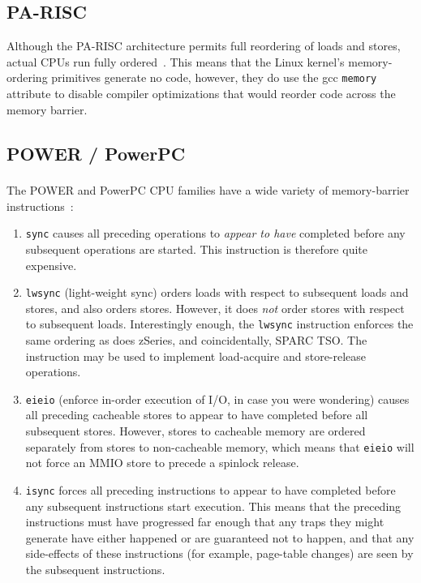 \subsection{PA-RISC}

Although the PA-RISC architecture permits full reordering of loads and
stores, actual CPUs run fully ordered~\cite{GerryKane96a}.
This means that the Linux kernel's memory-ordering primitives generate
no code, however, they do use the gcc {\tt memory} attribute to disable
compiler optimizations that would reorder code across the memory
barrier.

\subsection{POWER / PowerPC}
\label{sec:app:whymb:POWER / PowerPC}

The POWER and PowerPC\textsuperscript{\textregistered}
CPU families have a wide variety of memory-barrier
instructions~\cite{PowerPC94,MichaelLyons02a}:
\begin{enumerate}
\item	{\tt sync} causes all preceding operations to {\em appear to have}
	completed before any subsequent operations are started.
	This instruction is therefore quite expensive.
\item	{\tt lwsync} (light-weight sync) orders loads with respect to
	subsequent loads and stores, and also orders stores.
	However, it does {\em not} order stores with respect to subsequent
	loads.
	Interestingly enough, the {\tt lwsync} instruction enforces
	the same ordering as does zSeries, and coincidentally,
	SPARC TSO.
	The  instruction may be used to implement
	load-acquire and store-release operations.
\item	{\tt eieio} (enforce in-order execution of I/O, in case you
	were wondering) causes all preceding cacheable stores to appear
	to have completed before all subsequent stores.
	However, stores to cacheable memory are ordered separately from
	stores to non-cacheable memory, which means that {\tt eieio}
	will not force an MMIO store to precede a spinlock release.
\item	{\tt isync} forces all preceding instructions to appear to have
	completed before any subsequent instructions start execution.
	This means that the preceding instructions must have progressed
	far enough that any traps they might generate have either happened
	or are guaranteed not to happen, and that any side-effects of
	these instructions (for example, page-table changes) are seen by the
	subsequent instructions.
\end{enumerate}

